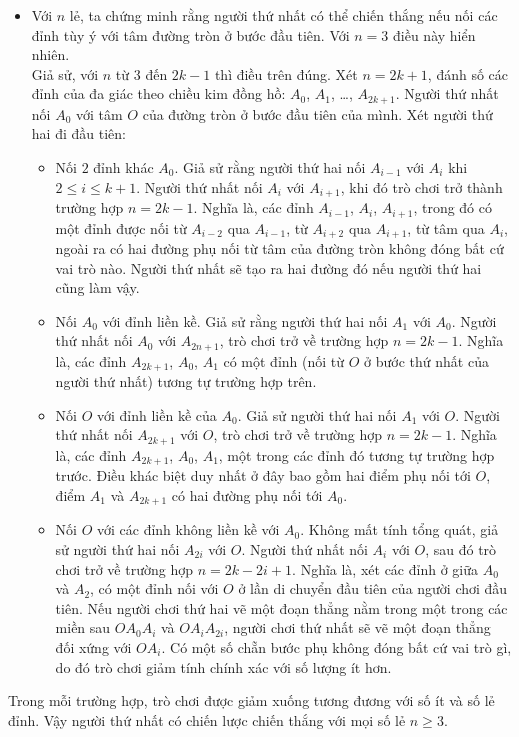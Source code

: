 \begin{ex}
{\begin{itemize}
\begin{itemize}
			Sau khi thực hiện các bước $x$ và $x*$, các điểm nối lại không bao gồm tâm, $B=A^*$, $A=B^*$ và bước $x^*$ không làm giảm số điểm. Vậy người thứ hai có thể chiến thằng bằng việc thực hiện bước $z$ bao gồm $x^*$.
		\end{itemize}
		\item Với $n$ lẻ, ta chứng minh rằng người thứ nhất có thể chiến thắng nếu nối các đỉnh tùy ý với tâm đường tròn ở bước đầu tiên. Với $n=3$ điều này hiển nhiên.\\
		Giả sử, với $n$ từ $3$ đến $2k-1$ thì điều trên đúng. Xét $n=2k+1$, đánh số các đỉnh của đa giác theo chiều kim đồng hồ: $A_0$, $A_1$, \ldots, $A_{2k+1}$. Người thứ nhất nối $A_0$ với tâm $O$ của đường tròn ở bước đầu tiên của mình. Xét người thứ hai đi đầu tiên:
		\begin{itemize}
			\item Nối $2$ đỉnh khác $A_0$. Giả sử rằng người thứ hai nối $A_{i-1}$ với $A_i$ khi $2\le i\le k+1$. Người thứ nhất nối $A_i$ với $A_{i+1}$, khi đó trò chơi trở thành trường hợp $n=2k-1$. Nghĩa là, các đỉnh $A_{i-1}$, $A_i$, $A_{i+1}$, trong đó có một đỉnh được nối từ $A_{i-2}$ qua $A_{i-1}$, từ $A_{i+2}$ qua $A_{i+1}$, từ tâm qua $A_i$, ngoài ra có hai đường phụ nối từ tâm của đường tròn không đóng bất cứ vai trò nào. Người thứ nhất sẽ tạo ra hai đường đó nếu người thứ hai cũng làm vậy.
			\item Nối $A_0$ với đỉnh liền kề. Giả sử rằng người thứ hai nối $A_1$ với $A_0$. Người thứ nhất nối $A_0$ với $A_{2n+1}$, trò chơi trở về trường hợp $n=2k-1$. Nghĩa là, các đỉnh $A_{2k+1}$, $A_0$, $A_1$ có một đỉnh (nối từ $O$ ở bước thứ nhất của người thứ nhất) tương tự trường hợp trên.
			\item Nối $O$ với đỉnh liền kề của $A_0$. Giả sử người thứ hai nối $A_1$ với $O$. Người thứ nhất nối $A_{2k+1}$ với $O$, trò chơi trở về trường hợp $n=2k-1$. Nghĩa là, các đỉnh $A_{2k+1}$, $A_0$, $A_1$, một trong các đỉnh đó tương tự trường hợp trước. Điều khác biệt duy nhất ở đây bao gồm hai điểm phụ nối tới $O$, điểm $A_1$ và $A_{2k+1}$ có hai đường phụ nối tới $A_0$.
			\item Nối $O$ với các đỉnh không liền kề với $A_0$. Không mất tính tổng quát, giả sử người thứ hai nối $A_{2i}$ với $O$. Người thứ nhất nối $A_i$ với $O$, sau đó trò chơi trở về trường hợp $n=2k-2i+1$. Nghĩa là, xét các đỉnh ở giữa $A_0$ và $A_2$, có một đỉnh nối với $O$ ở lần di chuyển đầu tiên của người chơi đầu tiên. Nếu người chơi thứ hai vẽ một đoạn thẳng nằm trong một trong các miền sau $OA_0A_i$ và $OA_iA_{2i}$, người chơi thứ nhất sẽ vẽ một đoạn thẳng đối xứng với $OA_i$. Có một số chẵn bước phụ không đóng bất cứ vai trò gì, do đó trò chơi giảm tính chính xác với số lượng ít hơn.
		\end{itemize} 
	\end{itemize}
Trong mỗi trường hợp, trò chơi được giảm xuống tương đương với số ít và số lẻ đỉnh. Vậy người thứ nhất có chiến lược chiến thắng với mọi số lẻ $n\ge 3$.
}
\end{ex}
